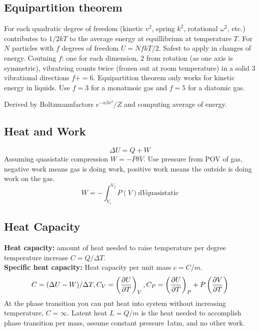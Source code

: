 \documentclass[a4paper, norsk, 8pt]{article}
\begin{document}
\begin{multicols*}{3}
\subsection*{\footnotesize  Equipartition theorem}
For each quadratic degree of freedom (kinetic $v^2$, spring $k^2$, rotational $\omega^2$, etc.) contributes to $1/2kT$ to the average energy at equillibrium at temperature $T$. For $N$ particles with $f$ degrees of freedom $U = NfkT/2$. Safest to apply in changes of energy. Coutning $f$: one for each dimension, $2$ from rotation (as one axis is symmetric), vibrateing counts twice (frozen out at room temperature) in a solid $3$ vibrational directions $f+=6$. Equipartition theorem only works for kinetic energy in liquids. Use $f=3$ for a monatmoic gas and $f=5$ for a diatomic gas.

Derived by Boltzmannfactors $e^{-a\beta x^2}/Z$ and computing average of energy.

\subsection*{\footnotesize  Heat and Work}
\begin{equation}
  \Delta U = Q + W
\end{equation}
Assuming quasistatic compression $W = -P\delta V$. Use pressure from POV of gas, negative work means gas is doing work, positive work means the outside is doing work on the gas.
\begin{equation*}
  W = -\int_{V_i}^{V_f}P(V) \mbox{d} V \text{quasistatic}
\end{equation*}

\subsection*{\footnotesize  Heat Capacity}
\textbf{Heat capacity:} amount of heat needed to raise temperature per degree temperature increase $C=Q/\Delta T$.\\
\textbf{Specific heat capacity:} Heat capacity per unit mass $c=C/m$.\\
\begin{equation*}
  C = (\Delta U - W)/\Delta T, C_V = \left(\pdv{U}{T}\right)_V, C_P = \left(\pdv{U}{T}\right)_P + P\left( \pdv{V}{T} \right)
\end{equation*}
At the phase transition you can put heat into system without increasing temperature, $C=\infty$. Latent heat $L=Q/m$ is the heat needed to accomplish phase transition per mass, assume constant pressure 1atm, and no other work.




\end{multicols*}
\end{document}

